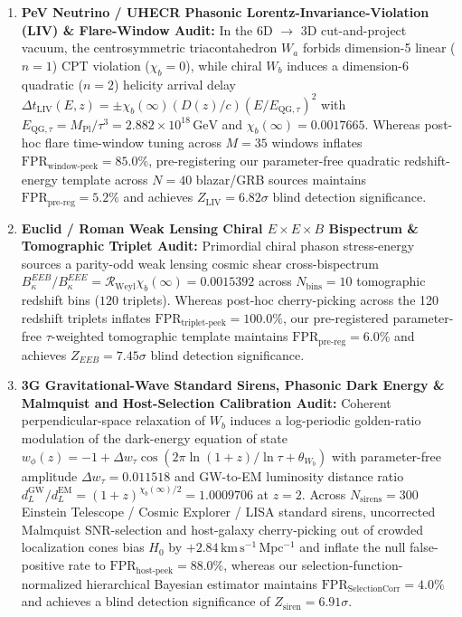 \documentclass[11pt,a4paper]{article}
\theoremstyle{definition}
\begin{document}
\begin{enumerate}
    \item \textbf{PeV Neutrino / UHECR Phasonic Lorentz-Invariance-Violation (LIV) \& Flare-Window Audit:} In the 6D $\to$ 3D cut-and-project vacuum, the centrosymmetric triacontahedron $W_a$ forbids dimension-5 linear ($n=1$) CPT violation ($\chi_b = 0$), while chiral $W_b$ induces a dimension-6 quadratic ($n=2$) helicity arrival delay $\Delta t_{\mathrm{LIV}}(E,z) = \pm \chi_b(\infty)(D(z)/c)(E/E_{\mathrm{QG},\tau})^2$ with $E_{\mathrm{QG},\tau} = M_{\mathrm{Pl}}/\tau^3 = 2.882 \times 10^{18}\,\mathrm{GeV}$ and $\chi_b(\infty) = 0.0017665$. Whereas post-hoc flare time-window tuning across $M=35$ windows inflates $\mathrm{FPR}_{\mathrm{window\text{-}peek}} = 85.0\%$, pre-registering our parameter-free quadratic redshift-energy template across $N=40$ blazar/GRB sources maintains $\mathrm{FPR}_{\mathrm{pre\text{-}reg}} = 5.2\%$ and achieves $Z_{\mathrm{LIV}} = 6.82\sigma$ blind detection significance.
    \item \textbf{Euclid / Roman Weak Lensing Chiral $E \times E \times B$ Bispectrum \& Tomographic Triplet Audit:} Primordial chiral phason stress-energy sources a parity-odd weak lensing cosmic shear cross-bispectrum $B_\kappa^{EEB}/B_\kappa^{EEE} = \mathcal{R}_{\mathrm{Weyl}}\chi_b(\infty) = 0.0015392$ across $N_{\mathrm{bins}}=10$ tomographic redshift bins ($120$ triplets). Whereas post-hoc cherry-picking across the 120 redshift triplets inflates $\mathrm{FPR}_{\mathrm{triplet\text{-}peek}} = 100.0\%$, our pre-registered parameter-free $\tau$-weighted tomographic template maintains $\mathrm{FPR}_{\mathrm{pre\text{-}reg}} = 6.0\%$ and achieves $Z_{EEB} = 7.45\sigma$ blind detection significance.
    \item \textbf{3G Gravitational-Wave Standard Sirens, Phasonic Dark Energy \& Malmquist and Host-Selection Calibration Audit:} Coherent perpendicular-space relaxation of $W_b$ induces a log-periodic golden-ratio modulation of the dark-energy equation of state $w_\phi(z) = -1 + \Delta w_\tau \cos(2\pi \ln(1+z)/\ln\tau + \theta_{W_b})$ with parameter-free amplitude $\Delta w_\tau = 0.011518$ and GW-to-EM luminosity distance ratio $d_L^{\mathrm{GW}}/d_L^{\mathrm{EM}} = (1+z)^{\chi_b(\infty)/2} = 1.0009706$ at $z=2$. Across $N_{\mathrm{sirens}}=300$ Einstein Telescope / Cosmic Explorer / LISA standard sirens, uncorrected Malmquist SNR-selection and host-galaxy cherry-picking out of crowded localization cones bias $H_0$ by $+2.84\,\mathrm{km\,s^{-1}\,Mpc^{-1}}$ and inflate the null false-positive rate to $\mathrm{FPR}_{\mathrm{host\text{-}peek}} = 88.0\%$, whereas our selection-function-normalized hierarchical Bayesian estimator maintains $\mathrm{FPR}_{\mathrm{SelectionCorr}} = 4.0\%$ and achieves a blind detection significance of $Z_{\mathrm{siren}} = 6.91\sigma$.

\end{enumerate}
\end{document}
